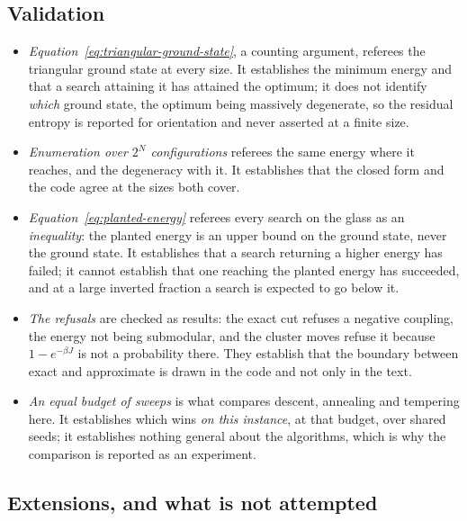 \documentclass[11pt,a4paper]{article}
\begin{document}
\subsection{Validation}
\label{sec:frustrated:validation}
\begin{itemize}
  \item \emph{Equation~\ref{eq:triangular-ground-state}}, a counting argument,
    referees the triangular ground state at every size. It establishes the
    minimum energy and that a search attaining it has attained the optimum; it
    does not identify \emph{which} ground state, the optimum being massively
    degenerate, so the residual entropy is reported for orientation and never
    asserted at a finite size.
  \item \emph{Enumeration over $2^{N}$ configurations} referees the same
    energy where it reaches, and the degeneracy with it. It establishes that
    the closed form and the code agree at the sizes both cover.
  \item \emph{Equation~\ref{eq:planted-energy}} referees every search on the
    glass as an \emph{inequality}: the planted energy is an upper bound on the
    ground state, never the ground state. It establishes that a search
    returning a higher energy has failed; it cannot establish that one
    reaching the planted energy has succeeded, and at a large inverted
    fraction a search is expected to go below it.
  \item \emph{The refusals} are checked as results: the exact cut refuses a
    negative coupling, the energy not being submodular, and the cluster moves
    refuse it because $1 - e^{-\beta J}$ is not a probability there. They
    establish that the boundary between exact and approximate is drawn in the
    code and not only in the text.
  \item \emph{An equal budget of sweeps} is what compares descent, annealing
    and tempering here. It establishes which wins \emph{on this instance}, at
    that budget, over shared seeds; it establishes nothing general about the
    algorithms, which is why the comparison is reported as an experiment.
\end{itemize}

\subsection{Extensions, and what is not attempted}
\label{sec:frustrated:extensions}
\end{document}
